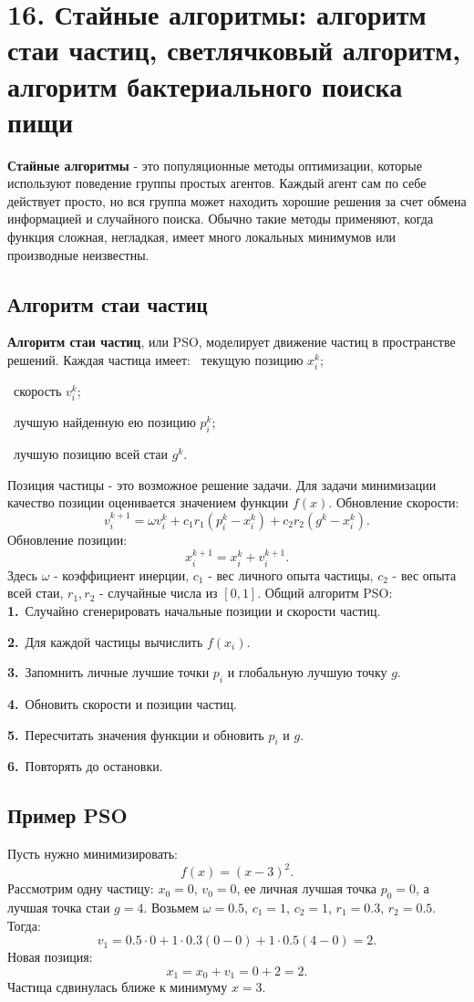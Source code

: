\documentclass[12pt,a4paper]{article}
\begin{document}
\section{16. Стайные алгоритмы: алгоритм стаи частиц, светлячковый алгоритм, алгоритм бактериального поиска пищи}
\textbf{Стайные алгоритмы} - это популяционные методы оптимизации, которые используют поведение группы простых агентов. Каждый агент сам по себе действует просто, но вся группа может находить хорошие решения за счет обмена информацией и случайного поиска.
Обычно такие методы применяют, когда функция сложная, негладкая, имеет много локальных минимумов или производные неизвестны.
\subsection{Алгоритм стаи частиц}
\textbf{Алгоритм стаи частиц}, или PSO, моделирует движение частиц в пространстве решений. Каждая частица имеет:
\noindent\textbullet\ текущую позицию $x_i^k$;\par
\noindent\textbullet\ скорость $v_i^k$;\par
\noindent\textbullet\ лучшую найденную ею позицию $p_i^k$;\par
\noindent\textbullet\ лучшую позицию всей стаи $g^k$.\par
Позиция частицы - это возможное решение задачи. Для задачи минимизации качество позиции оценивается значением функции $f(x)$.
Обновление скорости:
\[
v_i^{k+1}=\omega v_i^k+c_1r_1(p_i^k-x_i^k)+c_2r_2(g^k-x_i^k).
\]
Обновление позиции:
\[
x_i^{k+1}=x_i^k+v_i^{k+1}.
\]
Здесь $\omega$ - коэффициент инерции, $c_1$ - вес личного опыта частицы, $c_2$ - вес опыта всей стаи, $r_1,r_2$ - случайные числа из $[0,1]$.
Общий алгоритм PSO:
\noindent\textbf{1.}\ Случайно сгенерировать начальные позиции и скорости частиц.\par
\noindent\textbf{2.}\ Для каждой частицы вычислить $f(x_i)$.\par
\noindent\textbf{3.}\ Запомнить личные лучшие точки $p_i$ и глобальную лучшую точку $g$.\par
\noindent\textbf{4.}\ Обновить скорости и позиции частиц.\par
\noindent\textbf{5.}\ Пересчитать значения функции и обновить $p_i$ и $g$.\par
\noindent\textbf{6.}\ Повторять до остановки.\par
\subsection{Пример PSO}
Пусть нужно минимизировать:
\[
f(x)=(x-3)^2.
\]
Рассмотрим одну частицу: $x_0=0$, $v_0=0$, ее личная лучшая точка $p_0=0$, а лучшая точка стаи $g=4$. Возьмем $\omega=0.5$, $c_1=1$, $c_2=1$, $r_1=0.3$, $r_2=0.5$.
Тогда:
\[
v_1=0.5\cdot 0+1\cdot 0.3(0-0)+1\cdot 0.5(4-0)=2.
\]
Новая позиция:
\[
x_1=x_0+v_1=0+2=2.
\]
Частица сдвинулась ближе к минимуму $x=3$.
\end{document}
